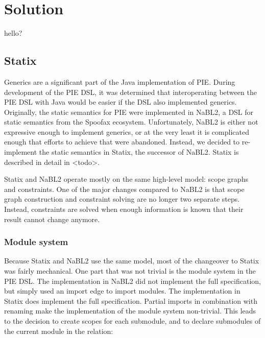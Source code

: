 \chapter{\label{chap:solution}Solution}

hello?

\section{\label{sec:solution__statix}Statix}
Generics are a significant part of the Java implementation of \ac{PIE}.
During development of the \ac{PIE} \ac{DSL}, it was determined that interoperating between the \ac{PIE} \ac{DSL} with Java would be easier if the \ac{DSL} also implemented generics.
Originally, the static semantics for \ac{PIE} were implemented in NaBL2, a \ac{DSL} for static semantics from the Spoofax ecosystem.
Unfortunately, \ac{NaBL2} is either not expressive enough to implement generics, or at the very least it is complicated enough that efforts to achieve that were abandoned. 
Instead, we decided to re-implement  the static semantics in Statix, the successor of \ac{NaBL2}.
Statix is described in detail in <todo>.

Statix and \ac{NaBL2} operate mostly on the same high-level model: scope graphs and constraints.
One of the major changes compared to \ac{NaBL2} is that scope graph construction and constraint solving are no longer two separate steps.
Instead, constraints are solved when enough information is known that their result cannot change anymore.

\subsection{\label{subsec:solution__statix__module_system}Module system}
Because Statix and \ac{NaBL2} use the same model, most of the changeover to Statix was fairly mechanical.
One part that was not trivial is the module system in the \ac{PIE} \ac{DSL}.
The implementation in \ac{NaBL2} did not implement the full specification, but simply used an import edge to import modules. 
The implementation in Statix does implement the full specification.
Partial imports  in combination with renaming make the implementation of the module system non-trivial.
This leads to the decision to create scopes for each submodule, and to declare submodules of the current module in the  relation:

